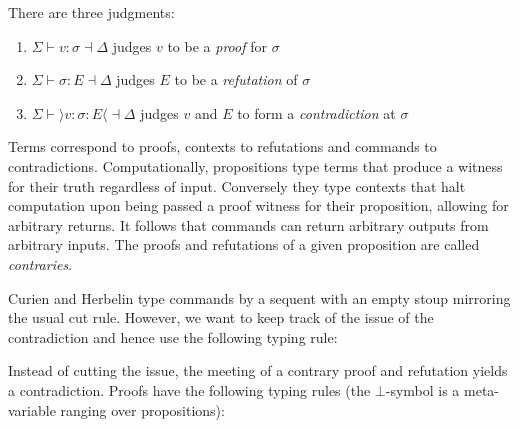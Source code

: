 \documentclass{IOS-Book-Article}
\begin{document}
There are three judgments:
\begin{enumerate}
\item $\Sigma\vdash v:\sigma \dashv \Delta$ judges $v$ to be a \emph{proof} for $\sigma$
\item $\Sigma\vdash \sigma:E \dashv \Delta$ judges $E$ to be a \emph{refutation} of $\sigma$
\item $\Sigma\vdash \rangle v:\sigma:E\langle \dashv \Delta$ judges $v$ and $E$ to form a \emph{contradiction} at $\sigma$
\end{enumerate}

Terms correspond to proofs, contexts to refutations and commands to contradictions.
Computationally, propositions type terms that produce a witness for their truth regardless of input.
Conversely they type contexts that halt computation upon being passed a proof witness for their proposition, allowing for arbitrary returns.
It follows that commands can return arbitrary outputs from arbitrary inputs.
The proofs and refutations of a given proposition are called \emph{contraries}.

Curien and Herbelin \cite{CurienHerbelin2000-DualityOfComputation} type commands by a sequent with an empty stoup mirroring the usual cut rule.
However, we want to keep track of the issue of the contradiction and hence use the following typing rule:

\begin{center}
  \begin{minipage}{0.48\linewidth}
    \begin{prooftree}
      \label{rule:S-ELIM}
    \end{prooftree}
  \end{minipage}
\end{center}

Instead of cutting the issue, the meeting of a contrary proof and refutation yields a contradiction.
Proofs have the following typing rules (the $\bot$-symbol is a meta-variable ranging over propositions):
\end{document}
